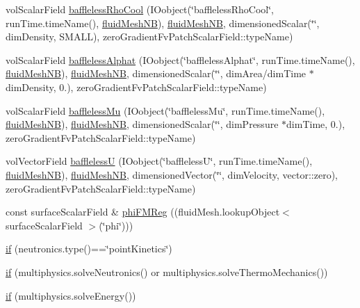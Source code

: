 \begin{DoxyCompactItemize}
\item 
vol\+Scalar\+Field \hyperlink{createCouplingFields_8H_acbd5edcbed05274fed4877890e2ebef8}{baffleless\+Rho\+Cool} (I\+Oobject(\char`\"{}baffleless\+Rho\+Cool\char`\"{}, run\+Time.\+time\+Name(), \hyperlink{createFluidMesh_8H_a19096e6b5a147939b336269d09a08e3c}{fluid\+Mesh\+NB}), \hyperlink{createFluidMesh_8H_a19096e6b5a147939b336269d09a08e3c}{fluid\+Mesh\+NB}, dimensioned\+Scalar(\char`\"{}\char`\"{}, dim\+Density, S\+M\+A\+LL), zero\+Gradient\+Fv\+Patch\+Scalar\+Field\+::type\+Name)
\item 
vol\+Scalar\+Field \hyperlink{createCouplingFields_8H_a51d0a72cd31afeebdc70910e8fadefbd}{baffleless\+Alphat} (I\+Oobject(\char`\"{}baffleless\+Alphat\char`\"{}, run\+Time.\+time\+Name(), \hyperlink{createFluidMesh_8H_a19096e6b5a147939b336269d09a08e3c}{fluid\+Mesh\+NB}), \hyperlink{createFluidMesh_8H_a19096e6b5a147939b336269d09a08e3c}{fluid\+Mesh\+NB}, dimensioned\+Scalar(\char`\"{}\char`\"{}, dim\+Area/dim\+Time $\ast$dim\+Density, 0.), zero\+Gradient\+Fv\+Patch\+Scalar\+Field\+::type\+Name)
\item 
vol\+Scalar\+Field \hyperlink{createCouplingFields_8H_a72174d79fe37f0b270d2dd5e28a10b5c}{baffleless\+Mu} (I\+Oobject(\char`\"{}baffleless\+Mu\char`\"{}, run\+Time.\+time\+Name(), \hyperlink{createFluidMesh_8H_a19096e6b5a147939b336269d09a08e3c}{fluid\+Mesh\+NB}), \hyperlink{createFluidMesh_8H_a19096e6b5a147939b336269d09a08e3c}{fluid\+Mesh\+NB}, dimensioned\+Scalar(\char`\"{}\char`\"{}, dim\+Pressure $\ast$dim\+Time, 0.), zero\+Gradient\+Fv\+Patch\+Scalar\+Field\+::type\+Name)
\item 
vol\+Vector\+Field \hyperlink{createCouplingFields_8H_a9ceb90c22509b7e3c11b8e5950d1bd02}{bafflelessU} (I\+Oobject(\char`\"{}bafflelessU\char`\"{}, run\+Time.\+time\+Name(), \hyperlink{createFluidMesh_8H_a19096e6b5a147939b336269d09a08e3c}{fluid\+Mesh\+NB}), \hyperlink{createFluidMesh_8H_a19096e6b5a147939b336269d09a08e3c}{fluid\+Mesh\+NB}, dimensioned\+Vector(\char`\"{}\char`\"{}, dim\+Velocity, vector\+::zero), zero\+Gradient\+Fv\+Patch\+Scalar\+Field\+::type\+Name)
\item 
const surface\+Scalar\+Field \& \hyperlink{createCouplingFields_8H_a75594cc07a0c438b421a97e497237e1b}{phi\+F\+M\+Reg} ((fluid\+Mesh.\+lookup\+Object$<$ surface\+Scalar\+Field $>$(\char`\"{}phi\char`\"{})))
\item 
\hyperlink{createCouplingFields_8H_a03e0fe7184a8bdd95c3d2cf5fa24bf4f}{if} (neutronics.\+type()==\char`\"{}point\+Kinetics\char`\"{})
\item 
\hyperlink{createCouplingFields_8H_ad1f8dc12b23c4060b489e1c40b027703}{if} (multiphysics.\+solve\+Neutronics() or multiphysics.\+solve\+Thermo\+Mechanics())
\item 
\hyperlink{createCouplingFields_8H_ab1cdc8cb62af85f724625303bbfd046f}{if} (multiphysics.\+solve\+Energy())
\end{DoxyCompactItemize}
